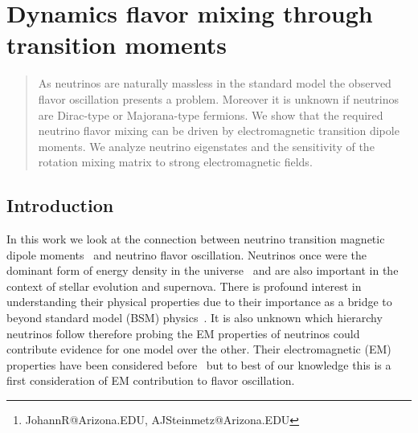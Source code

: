 \documentclass[addchapnum]{ws-rv961x669} %
\begin{document}
\chapter[Dynamic flavor mixing through transition moments]{Dynamics flavor mixing through transition moments\label{JR_ch1}}

\author[J. Rafelski and A. Steinmetz]{Johann Rafelski and Andrew Steinmetz\footnote{JohannR@Arizona.EDU, AJSteinmetz@Arizona.EDU}}

\address{Department of Physics, The University of Arizona, Tucson, AZ 85721, USA}

\begin{abstract} 
As neutrinos are naturally massless in the standard model the observed flavor oscillation presents a problem. Moreover it is unknown if neutrinos are Dirac-type or Majorana-type fermions. We show that the required neutrino flavor mixing can be driven by electromagnetic transition dipole moments. We analyze neutrino eigenstates and the sensitivity of the rotation mixing matrix to strong electromagnetic fields.
\end{abstract}


\body


\section{Introduction}
\label{sec:intro}

In this work we look at the connection between neutrino transition magnetic dipole moments~\cite{Shrock:1980vy,Shrock:1982sc} and neutrino flavor oscillation. Neutrinos once were the dominant form of energy density in the universe~\cite{Rafelski:2023emw} and are also important in the context of stellar evolution and supernova. There is profound interest in understanding their physical properties due to their importance as a bridge to beyond standard model (BSM) physics~\cite{DUNE:2020fgq}. It is also unknown which hierarchy neutrinos follow therefore probing the EM properties of neutrinos could contribute evidence for one model over the other. Their electromagnetic (EM) properties have been considered before~\cite{Giunti:2014ixa} but to best of our knowledge this is a first consideration of EM contribution to flavor oscillation.
\end{document}
